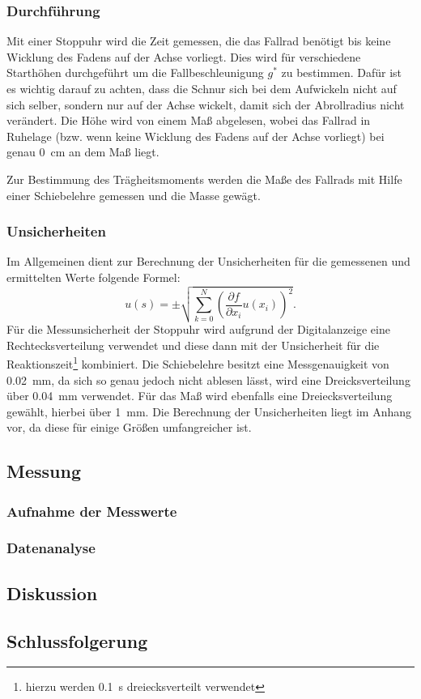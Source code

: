 		\subsubsection{Durchführung}
			
			Mit einer Stoppuhr wird die Zeit gemessen, die das Fallrad benötigt bis keine Wicklung des Fadens auf der Achse vorliegt. Dies wird für verschiedene Starthöhen durchgeführt um die Fallbeschleunigung $g^{*}$ zu bestimmen. Dafür ist es wichtig darauf zu achten, dass die Schnur sich bei dem Aufwickeln nicht auf sich selber, sondern nur auf der Achse wickelt, damit sich der Abrollradius nicht verändert.
			Die Höhe wird von einem Maß abgelesen, wobei das Fallrad in Ruhelage (bzw. wenn keine Wicklung des Fadens auf der Achse vorliegt) bei genau \SI{0}{\cm} an dem Maß liegt. 
			
			Zur Bestimmung des Trägheitsmoments werden die Maße des Fallrads mit Hilfe einer Schiebelehre gemessen und die Masse gewägt.			
			
		\subsubsection{Unsicherheiten}
			
			Im Allgemeinen dient zur Berechnung der Unsicherheiten für die gemessenen und ermittelten Werte folgende Formel: 
			\begin{equation*}
				u(s) = \pm \sqrt{\sum_{k=0}^{N}\left( \frac{\partial f}{\partial x_i}u(x_i)\right) ^2}. \label{eq:kombUnsicherheit}
			\end{equation*}
			Für die Messunsicherheit der Stoppuhr wird aufgrund der Digitalanzeige eine Rechtecksverteilung verwendet und diese dann mit der Unsicherheit für die Reaktionszeit\footnote{hierzu werden \SI{0.1}{\s} dreiecksverteilt verwendet} kombiniert. Die Schiebelehre besitzt eine Messgenauigkeit von \SI{0,02}{\mm}, da sich so genau jedoch nicht ablesen lässt, wird eine Dreicksverteilung über \SI{0,04}{\mm} verwendet. Für das Maß wird ebenfalls eine Dreiecksverteilung gewählt, hierbei über \SI{1}{\mm}.
			Die Berechnung der Unsicherheiten liegt im Anhang vor, da diese für einige Größen umfangreicher ist.
			
	\subsection{Messung}
	
		\subsubsection{Aufnahme der Messwerte}
	
		\subsubsection{Datenanalyse}	

	\subsection{Diskussion}
		
	\subsection{Schlussfolgerung}
	